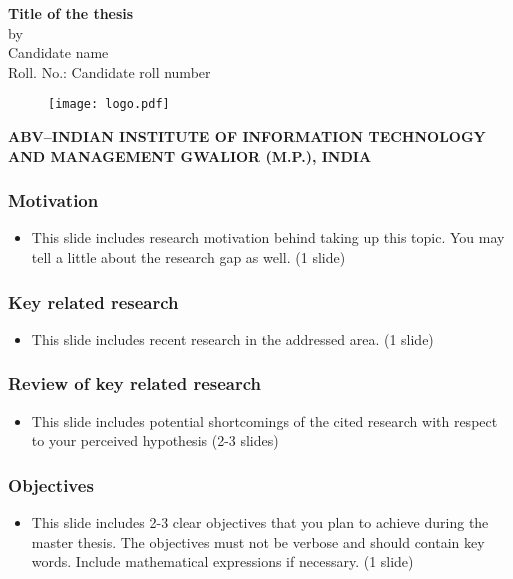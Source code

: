 \documentclass{beamer}
\begin{document}
\begin{frame}
\begin{center}
{\bf \large{{\textup{\textbf{\textup{{Title of the thesis}}}}}}
\\[0.4in]}
by\\[0.2in]
{ {Candidate name}}\\[0.1in]
{Roll. No.: Candidate roll number}\\
\begin{figure}[ht]
\centering
\texttt{[image: logo.pdf]}\\
\end{figure}
{{\bf ABV--INDIAN INSTITUTE OF INFORMATION TECHNOLOGY AND MANAGEMENT GWALIOR (M.P.), INDIA\\[0.1in]}
}
\end{center}
\end{frame}

\begin{frame}\frametitle{Motivation}
\begin{itemize}
\item This slide includes research motivation behind taking up this topic. You may tell a little about the research gap as well. (1 slide)
\end{itemize}
\end{frame}

\begin{frame}\frametitle{Key related research}
\begin{itemize}
\item This slide includes recent research in the addressed area. (1 slide)
\end{itemize}
\end{frame}


\begin{frame}\frametitle{Review of key related research}
\begin{itemize}
\item This slide includes potential shortcomings of the cited research with respect to your perceived hypothesis (2-3 slides)
\end{itemize}
\end{frame}

\begin{frame}\frametitle{Objectives}
\begin{itemize}
\item This slide includes 2-3 clear objectives that you plan to achieve during the master thesis. The objectives must not be verbose and should contain key words. Include mathematical expressions if necessary. (1 slide)
\end{itemize}
\end{frame}
\end{document}
